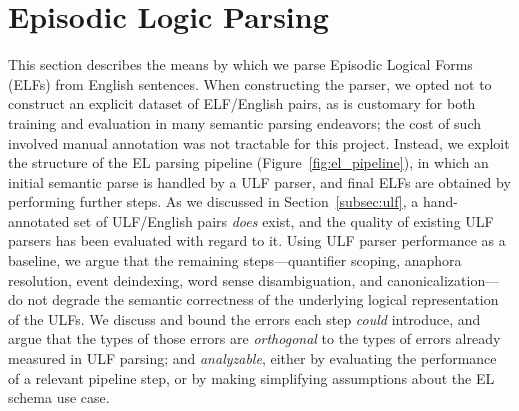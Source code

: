 \section{Episodic Logic Parsing}
\label{sec:parsing}
This section describes the means by which we parse Episodic Logical Forms (ELFs) from English sentences. When constructing the parser, we opted not to construct an explicit dataset of ELF/English pairs, as is customary for both training and evaluation in many semantic parsing endeavors; the cost of such involved manual annotation was not tractable for this project. Instead, we exploit the structure of the EL parsing pipeline (Figure~\ref{fig:el_pipeline}), in which an initial semantic parse is handled by a ULF parser, and final ELFs are obtained by performing further steps.
As we discussed in Section~\ref{subsec:ulf}, a hand-annotated set of ULF/English pairs \textit{does} exist, and the quality of existing ULF parsers has been evaluated with regard to it.
Using ULF parser performance as a baseline, we argue that the remaining steps---quantifier scoping, anaphora resolution, event deindexing, word sense disambiguation, and canonicalization---do not degrade the semantic correctness of the underlying logical representation of the ULFs.
We discuss and bound the errors each step \textit{could} introduce, and argue that the types of those errors are \textit{orthogonal} to the types of errors already measured in ULF parsing; and \textit{analyzable}, either by evaluating the performance of a relevant pipeline step, or by making simplifying assumptions about the EL schema use case.

